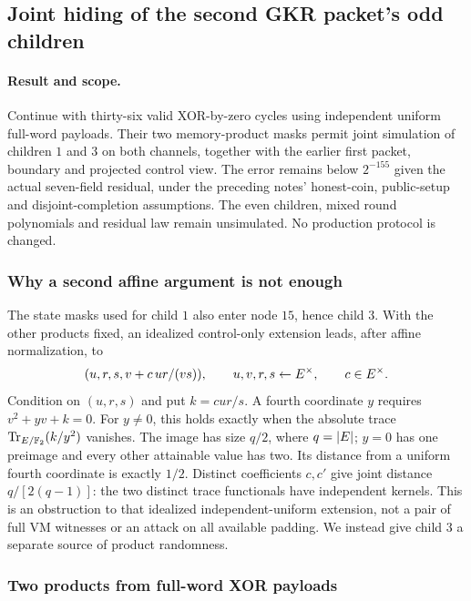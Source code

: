 \subsection{Joint hiding of the second GKR packet's odd children}\label{note:zk-odd-children}

\paragraph{Result and scope.} Continue  with thirty-six valid XOR-by-zero cycles using independent uniform full-word payloads. Their two memory-product masks permit joint simulation of children $1$ and $3$ on both channels, together with the earlier first packet, boundary and projected control view. The error remains below $2^{-155}$ given the actual seven-field residual, under the preceding notes' honest-coin, public-setup and disjoint-completion assumptions. The even children, mixed round polynomials and residual law remain unsimulated. No production protocol is changed.

\subsubsection{Why a second affine argument is not enough}

The state masks used for child $1$ also enter node $15$, hence child $3$. With the other products fixed, an idealized control-only extension leads, after affine normalization, to
\[
 (u,r,s,v+c\,ur/(vs)),\qquad u,v,r,s\gets E^\times,
 \qquad c\in E^\times.
\]
Condition on $(u,r,s)$ and put $k=cur/s$. A fourth coordinate $y$ requires $v^2+yv+k=0$. For $y\ne0$, this holds exactly when the absolute trace $\operatorname{Tr}_{E/\mathbb{F}_2}(k/y^2)$ vanishes. The image has size $q/2$, where $q=|E|$; $y=0$ has one preimage and every other attainable value has two. Its distance from a uniform fourth coordinate is exactly $1/2$. Distinct coefficients $c,c'$ give joint distance $q/[2(q-1)]$: the two distinct trace functionals have independent kernels. This is an obstruction to that idealized independent-uniform extension, not a pair of full VM witnesses or an attack on all available padding. We instead give child $3$ a separate source of product randomness.

\subsubsection{Two products from full-word XOR payloads}

